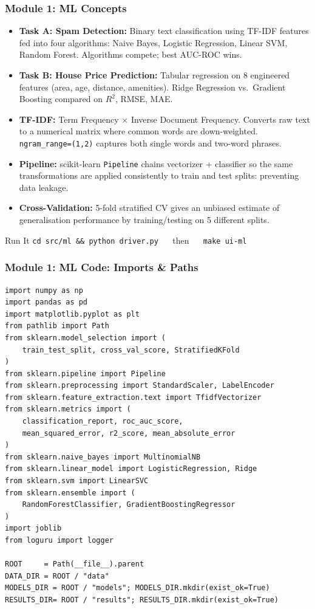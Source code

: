 \begin{frame}[fragile]\frametitle{Module 1: ML Concepts}
\begin{itemize}
  \item \textbf{Task A: Spam Detection:} Binary text classification using TF-IDF features fed into four algorithms: Naive Bayes, Logistic Regression, Linear SVM, Random Forest. Algorithms compete; best AUC-ROC wins.
  \item \textbf{Task B: House Price Prediction:} Tabular regression on 8 engineered features (area, age, distance, amenities). Ridge Regression vs.\ Gradient Boosting compared on $R^2$, RMSE, MAE.
  \item \textbf{TF-IDF:} Term Frequency × Inverse Document Frequency. Converts raw text to a numerical matrix where common words are down-weighted. \texttt{ngram\_range=(1,2)} captures both single words and two-word phrases.
  \item \textbf{Pipeline:} scikit-learn \texttt{Pipeline} chains vectorizer + classifier so the same transformations are applied consistently to train and test splits: preventing data leakage.
  \item \textbf{Cross-Validation:} 5-fold stratified CV gives an unbiased estimate of generalisation performance by training/testing on 5 different splits.
\end{itemize}
\begin{block}{Run It}
  \texttt{cd src/ml \&\& python driver.py} $\quad$ then $\quad$ \texttt{make ui-ml}
\end{block}
\end{frame}

\begin{frame}[fragile]\frametitle{Module 1: ML Code: Imports \& Paths}
\begin{lstlisting}
import numpy as np
import pandas as pd
import matplotlib.pyplot as plt
from pathlib import Path
from sklearn.model_selection import (
    train_test_split, cross_val_score, StratifiedKFold
)
from sklearn.pipeline import Pipeline
from sklearn.preprocessing import StandardScaler, LabelEncoder
from sklearn.feature_extraction.text import TfidfVectorizer
from sklearn.metrics import (
    classification_report, roc_auc_score,
    mean_squared_error, r2_score, mean_absolute_error
)
from sklearn.naive_bayes import MultinomialNB
from sklearn.linear_model import LogisticRegression, Ridge
from sklearn.svm import LinearSVC
from sklearn.ensemble import (
    RandomForestClassifier, GradientBoostingRegressor
)
import joblib
from loguru import logger

ROOT     = Path(__file__).parent
DATA_DIR = ROOT / "data"
MODELS_DIR = ROOT / "models"; MODELS_DIR.mkdir(exist_ok=True)
RESULTS_DIR= ROOT / "results"; RESULTS_DIR.mkdir(exist_ok=True)
\end{lstlisting}
\end{frame}

